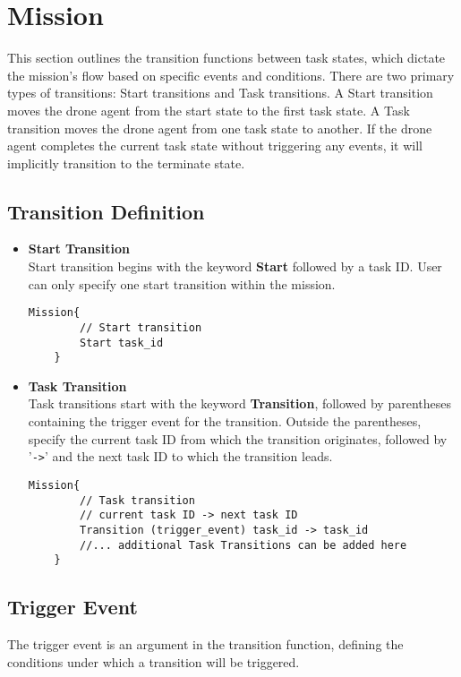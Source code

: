 \section{Mission}
This section outlines the transition functions between task states, which dictate the mission's flow based on specific events and conditions. There are two primary types of transitions: Start transitions and Task transitions. A Start transition moves the drone agent from the start state to the first task state. A Task transition moves the drone agent from one task state to another. If the drone agent completes the current task state without triggering any events, it will implicitly transition to the terminate state.

\subsection{Transition Definition}
\begin{itemize}
    \item \textbf{Start Transition} \\
    Start transition begins with the keyword \textbf{Start} followed by a task ID. User can only specify one start transition within the mission.
    \begin{lstlisting}[style=customgo]
    Mission{
        // Start transition
        Start task_id
    }
    \end{lstlisting}
    \item \textbf{Task Transition}\\
    Task transitions start with the keyword \textbf{Transition}, followed by parentheses containing the trigger event for the transition. Outside the parentheses, specify the current task ID from which the transition originates, followed by '\texttt{->}' and the next task ID to which the transition leads.
    \begin{lstlisting}[style=customgo]
    Mission{
        // Task transition
        // current task ID -> next task ID
        Transition (trigger_event) task_id -> task_id
        //... additional Task Transitions can be added here
    }
    \end{lstlisting}
\end{itemize}


\subsection{Trigger Event}
The trigger event is an argument in the transition function, defining the conditions under which a transition will be triggered. 


